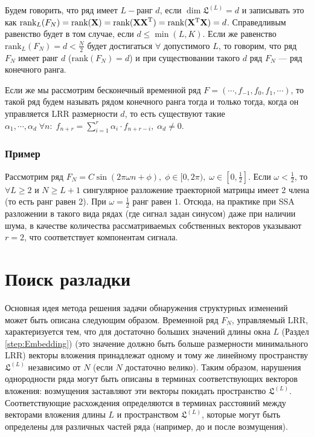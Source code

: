 \documentclass[specialist, substylefile = spbu.rtx,
			   subf, href, 12pt]{disser}
\begin{document}
Будем говорить, что ряд имеет $ L- $ранг $d$, если $\dim\mathfrak{L}^{(L)} = d$ и записывать это как $\textrm{rank}_L(F_N) = \textrm{rank}(\bold{X}) = \textrm{rank}(\bold{XX}^\mathrm{T}) = \textrm{rank}(\bold{X}^\mathrm{T}\bold{X}) = d$. Справедливым равенство будет в том случае, если $d\leq\min(L, K)$. Если же равенство $\textrm{rank}_L(F_N) = d < \frac{N}{2}$ будет достигаться $\forall$ допустимого $L$, то говорим, что ряд $F_N$ имеет ранг $d$ ($\textrm{rank}(F_N) = d$) и при существовании такого $d$ ряд $F_N$ --- ряд конечного ранга.

Если же мы рассмотрим бесконечный временной ряд $F=(\cdots, f_{-1}, f_0, f_1, \cdots)$, то такой ряд будем называть рядом конечного ранга тогда и только тогда, когда он управляется LRR размерности $d$, то есть существуют такие $\alpha_1, \cdots, \alpha_d \; \forall n: \; f_{n+r} = \sum_{i=1}^{r} \alpha_i\cdot f_{n+r-i}, \; \alpha_d \neq 0$.

\subsection{Пример}

Рассмотрим ряд $F_N = C\sin(2\pi\omega n + \phi),\;\phi \in [0, 2\pi), \; \omega \in [0, \frac{1}{2}]$. Если $\omega < \frac{1}{2}$, то $\forall L\geq 2$ и $N\geq L+1$ сингулярное разложение траекторной матрицы имеет 2 члена (то есть ранг равен 2). При $\omega=\frac{1}{2}$ ранг равен $1$. Отсюда, на практике при SSA разложении в такого вида рядах (где сигнал задан синусом) даже при наличии шума, в качестве количества рассматриваемых собственных векторов указывают $r=2$, что соответствует компонентам сигнала.

\chapter{Поиск разладки} \label{sec:ch_2}
Основная идея метода решения задачи обнаружения структурных изменений может быть описана следующим образом. Временной ряд $F_N$, управляемый LRR, характеризуется тем, что для достаточно больших значений длины окна $L$ (Раздел \ref{step:Embedding}) (это значение должно быть больше размерности минимального LRR) векторы вложения принадлежат одному и тому же линейному пространству $\mathfrak{L}^{(L)}$ независимо от $N$ (если $N$ достаточно велико). Таким образом, нарушения однородности ряда могут быть описаны в терминах соответствующих векторов вложения: возмущения заставляют эти векторы покидать пространство $\mathfrak{L}^{(L)}$. Соответствующие расхождения определяются в терминах расстояний между векторами вложения длины $ L $ и пространством $\mathfrak{L}^{(L)}$, которые могут быть определены для различных частей ряда (например, до и после возмущения).
\end{document}
